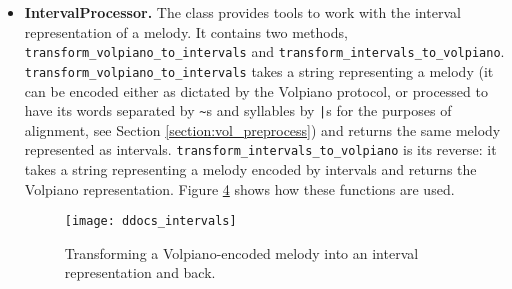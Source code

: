 \begin{itemize}
\begin{figure}[!h]
\centering
\texttt{[image: ddocs\_text-to-syllables]}
\caption{Example of dividing Latin text into syllables using \emph{ChantProcessor}.}
\label{fig:syl_text}
\end{figure}

\begin{figure}[!h]
\centering
\texttt{[image: ddocs\_volpiano\_to\_syllables]}
\caption{Example of dividing a melody encoded as Volpiano into syllables using \emph{ChantProcessor}.}
\label{fig:syl_volpiano}
\end{figure}

The method \verb|get_stressed_syllables| takes a Latin string as input and returns a list whose elements represent words, where word is a list of 0s and 1s,
a 0 representing an unstresed syllable and a 1 representing a stressed one. To calculate the stressed syllables, we use the module \verb|cltk|. However, 
its stress recognition is not completely accurate, therefore this method may also return incorrect results. However, no other functionality depends on
the results of the stress calculation. The function is shown in use in Figure \ref{fig:syl_stress}.

\begin{figure}[!h]
\centering
\texttt{[image: ddocs\_syllables-stressed]}
\caption{Example of finding the stressed syllables of a Latin text using \emph{ChantProcessor}.}
\label{fig:syl_stress}
\end{figure}

\item\textbf{IntervalProcessor.} The class provides tools to work with the interval representation of a melody. It contains two methods, \verb|transform_volpiano_to_intervals|
and \verb|transform_intervals_to_volpiano|. \verb|transform_volpiano_to_intervals| takes a string representing a melody (it can be encoded either as dictated by the Volpiano protocol, or processed
to have its words separated by \verb|~|s and syllables by \verb=|=s for the purposes of alignment, see Section \ref{section:vol_preprocess}) and returns the same melody represented as intervals.
\verb|transform_intervals_to_volpiano| is its reverse: it takes a string representing a melody encoded by intervals and returns the Volpiano representation.
Figure \ref{fig:vol_intervals} shows how these functions are used.

\begin{figure}[!h]
\centering
\texttt{[image: ddocs\_intervals]}
\caption{Transforming a Volpiano-encoded melody into an interval representation and back.}
\label{fig:vol_intervals}
\end{figure}


\end{itemize}
